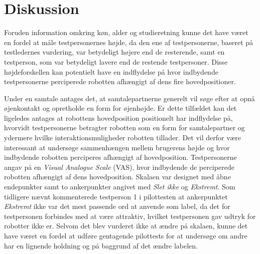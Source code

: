 \section{Diskussion}
\label{SkaleringseksperimentDiskussion}
%
Foruden information omkring køn, alder og studieretning kunne det have været en fordel at måle testpersonernes højde, da den ene af testpersonerne, baseret på testledernes vurdering, var betydeligt højere end de resterende, samt en testperson, som var betydeligt lavere end de restende testpersoner. Disse højdeforskellen kan potentielt have en indflydelse på hvor indbydende testpersonerne perciperede robotten afhængigt af dens fire hovedpositioner. 

Under en samtale antages det, at samtalepartnerne generelt vil søge efter at opnå øjenkontakt og opretholde en form for øjenhøjde. Er dette tilfældet kan det ligeledes antages at robottens hovedposition positionelt har indflydelse på, hvorvidt testpersonerne betragter robotten som en form for samtalepartner og ydermere hvilke interaktionsmuligheder robotten tillader. Det vil derfor være interessant at undersøge sammenhængen mellem brugerens højde og hvor indbydende robotten perciperes afhængigt af hovedposition.\blankline  
%
Testpersonerne angav på en \textit{Visual Analogue Scale} (VAS), hvor indbydende de perciperede robotten afhængigt af dens hovedposition. Skalaen var designet med åbne endepunkter samt to ankerpunkter angivet med \textit{Slet ikke} og \textit{Ekstremt}. Som tidligere nævnt kommenterede testperson 1 i pilottesten at ankerpunktet \textit{Ekstremt} ikke var det mest passende ord at anvende som label, da det for testpersonen forbindes med at være attraktiv, hvilket testpersonen gav udtryk for robotter ikke er. Selvom det blev vurderet ikke at ændre på skalaen, kunne det have været en fordel at udføre gentagende pilottests for at undersøge om andre har en lignende holdning og på baggrund af det ændre labelen.    


